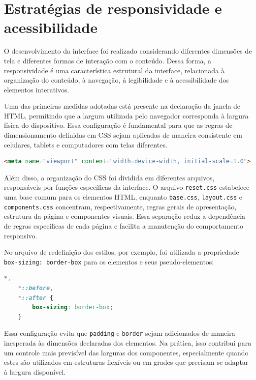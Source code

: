 \vspace{5mm}
\section{Estratégias de responsividade e acessibilidade}
O desenvolvimento da interface foi realizado considerando diferentes dimensões de tela e diferentes formas de interação com o conteúdo. Dessa forma, a responsividade é uma característica estrutural da interface, relacionada à organização do conteúdo, à navegação, à legibilidade e à acessibilidade dos elementos interativos.

Uma das primeiras medidas adotadas está presente na declaração da janela de HTML, permitindo que a largura utilizada pelo navegador corresponda à largura física do dispositivo. Essa configuração é fundamental para que as regras de dimensionamento definidas em CSS sejam aplicadas de maneira consistente em celulares, tablets e computadores com telas diferentes.

\begin{lstlisting}[language=HTML, caption={Configuração da janela de visualização do portal.}, label={lst:viewport}]
	<meta name="viewport" content="width=device-width, initial-scale=1.0">
\end{lstlisting}

Além disso, a organização do CSS foi dividida em diferentes arquivos, responsáveis por funções específicas da interface. O arquivo \texttt{reset.css} estabelece uma base comum para os elementos HTML, enquanto \texttt{base.css}, \texttt{layout.css} e \texttt{components.css} concentram, respectivamente, regras gerais de apresentação, estrutura da página e componentes visuais. Essa separação reduz a dependência de regras específicas de cada página e facilita a manutenção do comportamento responsivo.

No arquivo de redefinição dos estilos, por exemplo, foi utilizada a propriedade \texttt{box-sizing: border-box} para os elementos e seus pseudo-elementos:

\begin{lstlisting}[language=CSS, caption={Padronização do modelo de dimensionamento dos elementos.}, label={lst:boxsizing}]
	*,
	*::before,
	*::after {
		box-sizing: border-box;
	}
\end{lstlisting}

Essa configuração evita que \texttt{padding} e \texttt{border} sejam adicionados de maneira inesperada às dimensões declaradas dos elementos. Na prática, isso contribui para um controle mais previsível das larguras dos componentes, especialmente quando estes são utilizados em estruturas flexíveis ou em grades que precisam se adaptar à largura disponível.
\vspace{5mm}
